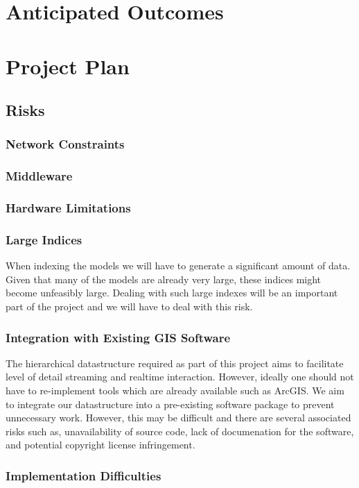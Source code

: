 \documentclass[12pt,a4paper]{article}
\begin{document}
\section{Anticipated Outcomes}

\section{Project Plan}
\subsection{Risks}
\subsubsection*{Network Constraints}
\subsubsection*{Middleware}
\subsubsection*{Hardware Limitations}
\subsubsection*{Large Indices}
When indexing the models we will have to generate a significant amount of data. Given that many of the models are already very large, these indices might become unfeasibly large. Dealing with such large indexes will be an important part of the project and we will have to deal with this risk.
\subsubsection*{Integration with Existing GIS Software}
The hierarchical datastructure required as part of this project aims to facilitate level of detail streaming and realtime interaction. However, ideally one should not have to re-implement tools which are already available such as ArcGIS. We aim to integrate our datastructure into a pre-existing software package to prevent unnecessary work. However, this may be difficult and there are several associated risks such as, unavailability of source code, lack of documenation for the software, and potential copyright license infringement.
\subsubsection*{Implementation Difficulties}
\end{document}
